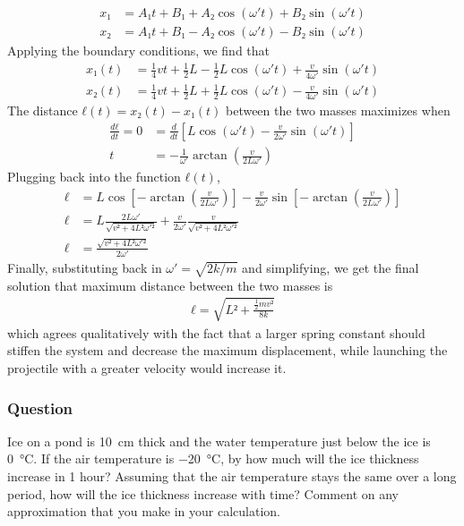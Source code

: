 \begin{align*}
    x₁ &= A₁t + B₁ + A₂\cos(ω't) + B₂\sin(ω't) \\
    x₂ &= A₁t + B₁ - A₂\cos(ω't) - B₂\sin(ω't)
\end{align*}
Applying the boundary conditions, we find that
\begin{align*}
    x₁(t) &= \frac 14 vt + \frac 12 L - \frac 12 L\cos(ω't) +
	\frac{v}{4ω'}\sin(ω't) \\
    x₂(t) &= \frac 14 vt + \frac 12 L + \frac 12 L\cos(ω't) -
	\frac{v}{4ω'}\sin(ω't)
\end{align*}
The distance $ℓ(t) = x₂(t) - x₁(t)$ between the two masses maximizes when
\begin{align*}
    \frac{dℓ}{dt} = 0 &= \frac{d}{dt} \left[ L\cos(ω't) -
	\frac{v}{2ω'}\sin(ω't) \right] \\
    t &= -\frac{1}{ω'} \arctan (\frac{v}{2Lω'})
\end{align*}
Plugging back into the function $ℓ(t)$,
\begin{align*}
    ℓ &= L\cos \left[ -\arctan (\frac{v}{2Lω'}) \right] - \frac{v}{2ω'}
	\sin \left[ -\arctan (\frac{v}{2Lω'}) \right] \\
    ℓ &= L \frac{2Lω'}{\sqrt{v² + 4L² {ω'}²}} + \frac{v}{2ω'}
	\frac{v}{\sqrt{v² + 4L² {ω'}²}} \\
    ℓ &= \frac{\sqrt{v² + 4L² {ω'}²}}{2ω'}
\end{align*}
Finally, substituting back in $ω' = \sqrt{2k/m}$ and simplifying, we get the
final solution that maximum distance between the two masses is
\begin{align}
    \boxed{
    ℓ = \sqrt{L² + \frac{\frac 12 mv²}{8k}}
    }
\end{align}
which agrees qualitatively with the fact that a larger spring constant should
stiffen the system and decrease the maximum displacement, while launching the
projectile with a greater velocity would increase it.

\subsubsection{Question}

Ice on a pond is \SI{10}{\cm} thick and the water temperature just below the
ice is \SI{0}{\celsius}. If the air temperature is \SI{-20}{\celsius}, by
how much will the ice thickness increase in 1 hour? Assuming that the air
temperature stays the same over a long period, how will the ice thickness
increase with time? Comment on any approximation that you make in your
calculation.

